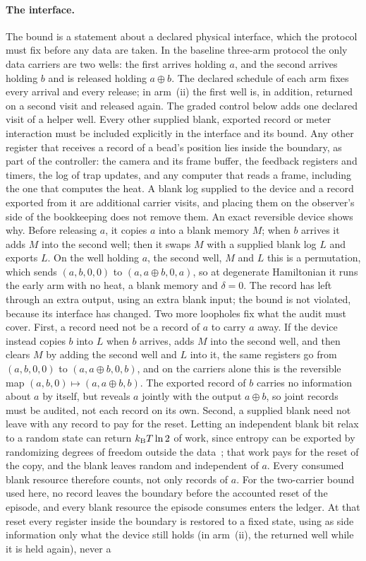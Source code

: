 \paragraph{The interface.} The bound is a statement about a declared physical interface, which the protocol must fix before any data are taken. In the baseline three-arm protocol the only data carriers are two wells: the first arrives holding $a$, and the second arrives holding $b$ and is released holding $a\oplus b$. The declared schedule of each arm fixes every arrival and every release; in arm~(ii) the first well is, in addition, returned on a second visit and released again. The graded control below adds one declared visit of a helper well. Every other supplied blank, exported record or meter interaction must be included explicitly in the interface and its bound. Any other register that receives a record of a bead's position lies inside the boundary, as part of the controller: the camera and its frame buffer, the feedback registers and timers, the log of trap updates, and any computer that reads a frame, including the one that computes the heat. A blank log supplied to the device and a record exported from it are additional carrier visits, and placing them on the observer's side of the bookkeeping does not remove them. An exact reversible device shows why. Before releasing $a$, it copies $a$ into a blank memory $M$; when $b$ arrives it adds $M$ into the second well; then it swaps $M$ with a supplied blank log $L$ and exports $L$. On the well holding $a$, the second well, $M$ and $L$ this is a permutation, which sends $(a,b,0,0)$ to $(a,a\oplus b,0,a)$, so at degenerate Hamiltonian it runs the early arm with no heat, a blank memory and $\delta=0$. The record has left through an extra output, using an extra blank input; the bound is not violated, because its interface has changed. Two more loopholes fix what the audit must cover. First, a record need not be a record of $a$ to carry $a$ away. If the device instead copies $b$ into $L$ when $b$ arrives, adds $M$ into the second well, and then clears $M$ by adding the second well and $L$ into it, the same registers go from $(a,b,0,0)$ to $(a,a\oplus b,0,b)$, and on the carriers alone this is the reversible map $(a,b,0)\mapsto(a,a\oplus b,b)$. The exported record of $b$ carries no information about $a$ by itself, but reveals $a$ jointly with the output $a\oplus b$, so joint records must be audited, not each record on its own. Second, a supplied blank need not leave with any record to pay for the reset. Letting an independent blank bit relax to a random state can return $k_{\mathrm B} T\ln2$ of work, since entropy can be exported by randomizing degrees of freedom outside the data~\cite{Bennett03}; that work pays for the reset of the copy, and the blank leaves random and independent of $a$. Every consumed blank resource therefore counts, not only records of $a$. For the two-carrier bound used here, no record leaves the boundary before the accounted reset of the episode, and every blank resource the episode consumes enters the ledger. At that reset every register inside the boundary is restored to a fixed state, using as side information only what the device still holds (in arm~(ii), the returned well while it is held again), never a 